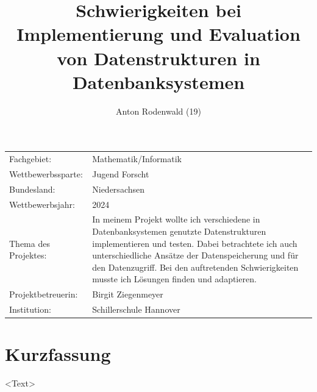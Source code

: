 \documentclass[11pt,a4paper]{article}
\begin{document}
\title{Schwierigkeiten bei Implementierung und Evaluation von Datenstrukturen in Datenbanksystemen}
\author{Anton Rodenwald (19)}
\maketitle

\addtocounter{page}{-3}
\thispagestyle{empty}

\large
\begin{tabular}{l p{12cm}}

    Fachgebiet:          & Mathematik/Informatik   \\

    Wettbewerbssparte:   & Jugend Forscht          \\

    Bundesland:          & Niedersachsen           \\

    Wettbewerbsjahr:     & 2024                    \\

    Thema des Projektes: &
    In meinem Projekt wollte ich verschiedene in Datenbanksystemen genutzte Datenstrukturen
    implementieren und testen. Dabei betrachtete ich auch unterschiedliche Ansätze der
    Datenspeicherung und für den Datenzugriff. Bei den auftretenden Schwierigkeiten
    musste ich Lösungen finden und adaptieren.     \\

    Projektbetreuerin:   & Birgit Ziegenmeyer      \\

    Institution:         & Schillerschule Hannover \\
\end{tabular}

\clearpage

\pagestyle{empty}


\section*{Kurzfassung}

<Text>

\clearpage


\renewcommand*\contentsname{Inhaltsverzeichnis}


\tableofcontents
\end{document}
